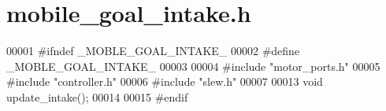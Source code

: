 \section{mobile\+\_\+goal\+\_\+intake.\+h}
\label{mobile__goal__intake_8h_source}

\begin{DoxyCode}
00001 \textcolor{preprocessor}{#ifndef \_MOBLE\_GOAL\_INTAKE\_}
00002 \textcolor{preprocessor}{#define  \_MOBLE\_GOAL\_INTAKE\_}
00003 
00004 \textcolor{preprocessor}{#include "motor_ports.h"}
00005 \textcolor{preprocessor}{#include "controller.h"}
00006 \textcolor{preprocessor}{#include "slew.h"}
00007 
00013 \textcolor{keywordtype}{void} update_intake();
00014 
00015 \textcolor{preprocessor}{#endif}
\end{DoxyCode}
